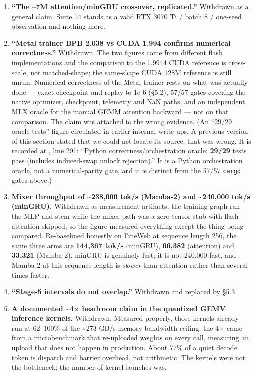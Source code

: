 \begin{enumerate}
\def\labelenumi{\arabic{enumi}.}
\tightlist
\item
  \textbf{``The \textasciitilde7M attention/minGRU crossover, replicated.''} Withdrawn as a general claim. Suite 14
  stands as a valid RTX 3070 Ti / batch 8 / one-seed observation and nothing more.
\item
  \textbf{``Metal trainer BPB 2.038 vs CUDA 1.994 confirms numerical correctness.''} Withdrawn. The two
  figures come from different flash implementations and the comparison to the 1.9944 CUDA
  reference is cross-scale, not matched-shape; the same-shape CUDA 128M reference is still
  unrun. Numerical correctness of the Metal trainer rests on what was actually done --- exact
  checkpoint-and-replay to 1e-6 (\S5.2), 57/57  gates covering the
  native optimizer, checkpoint, telemetry and NaN paths, and an independent MLX oracle for the
  manual GEMM attention backward --- not on that comparison. The claim was attached to the wrong
  evidence. (An ``29/29 oracle tests'' figure circulated in earlier internal write-ups. A previous
  version of this section stated that we could not locate its source; that was wrong. It is
  recorded at , line 291:
  ``Python correctness/orchestration oracle: \textbf{29/29} tests pass (includes induced-swap unlock
  rejection).'' It is a Python orchestration oracle, not a numerical-parity gate, and it is
  distinct from the 57/57 \texttt{cargo} gates above.)
\item
  \textbf{Mixer throughput of \textasciitilde238,000 tok/s (Mamba-2) and \textasciitilde240,000 tok/s (minGRU).} Withdrawn as
  measurement artifacts: the training graph ran the MLP and stem while the mixer path was a
  zero-tensor stub with flash attention skipped, so the figure measured everything except the
  thing being compared. Re-baselined honestly on FineWeb at sequence length 256, the same three
  arms are \textbf{144,367 tok/s} (minGRU), \textbf{66,382} (attention) and \textbf{33,321} (Mamba-2). minGRU is
  genuinely fast; it is not 240,000-fast, and Mamba-2 at this sequence length is \emph{slower} than
  attention rather than several times faster.
\item
  \textbf{``Stage-5 intervals do not overlap.''} Withdrawn and replaced by \S5.3.
\item
  \textbf{A documented \textasciitilde4$\times$ headroom claim in the quantized GEMV inference kernels.} Withdrawn. Measured
  properly, those kernels already run at 62--100\% of the \textasciitilde273 GB/s memory-bandwidth ceiling; the
  4$\times$ came from a microbenchmark that re-uploaded weights on every call, measuring an upload that
  does not happen in production. About 77\% of a quiet decode token is dispatch and barrier
  overhead, not arithmetic. The kernels were not the bottleneck; the number of kernel launches
  was.
\end{enumerate}

